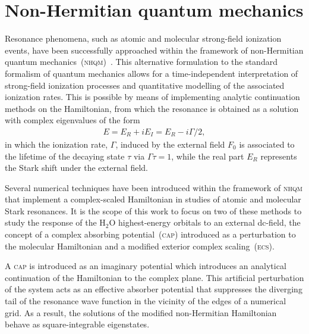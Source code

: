 \section{Non-Hermitian quantum mechanics}
\label{ch:nonH_qm}

Resonance phenomena, such as atomic and molecular strong-field
ionization events, have been successfully approached within the
framework of non-Hermitian quantum
mechanics~(\textsc{nhqm})~\cite{Moiseyev_NHQM}. This alternative
formulation to the standard formalism of quantum mechanics allows for
a time-independent interpretation of strong-field ionization processes
and quantitative modelling of the associated ionization rates. This is
possible by means of implementing analytic continuation methods on the
Hamiltonian, from which the resonance is obtained as a solution with
complex eigenvalues of the form
%
\begin{eqnarray}
  E = E_{R} + i E_{I} = E_{R} - i \Gamma/2,
  \label{eq:complex_eigenE}
\end{eqnarray}
%
in which the ionization rate, $\Gamma$, induced by the external field
$F_{0}$ is associated to the lifetime of the decaying state $\tau$ via
$\Gamma\tau = 1$, while the real part $E_{R}$ represents the Stark
shift under the external field.

Several numerical techniques have been introduced within the framework
of \textsc{nhqm} that implement a complex-scaled Hamiltonian in
studies of atomic and molecular Stark resonances. It is the scope of
this work to focus on two of these methods to study the response of
the H$_{2}$O highest-energy orbitals to an external dc-field, the
concept of a complex absorbing potential~(\textsc{cap}) introduced as
a perturbation to the molecular Hamiltonian and a modified exterior
complex scaling~(\textsc{ecs}).




A \textsc{cap} is introduced as an imaginary potential which
introduces an analytical continuation of the Hamiltonian to the
complex plane. This artificial perturbation of the system acts as an
effective absorber potential that suppresses the diverging tail of the
resonance wave function in the vicinity of the edges of a numerical
grid. As a result, the solutions of the modified non-Hermitian
Hamiltonian behave as square-integrable eigenstates.

